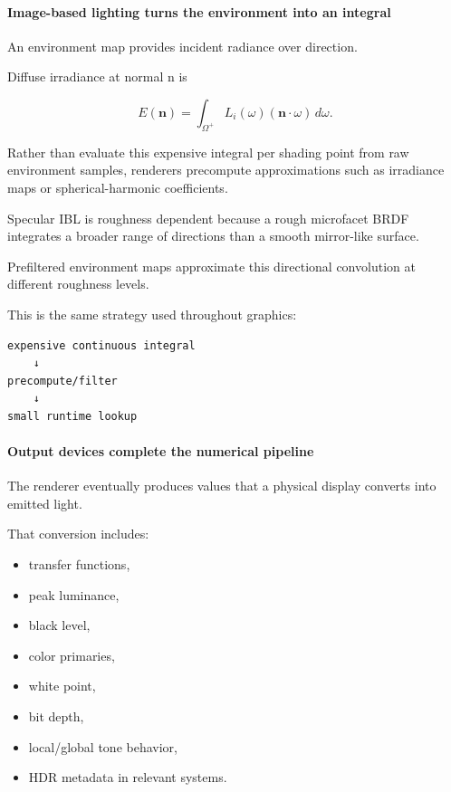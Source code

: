\paragraph{Image-based lighting turns the environment into an integral}\label{03-visual-computing-i-ch001-image-based-lighting-turns-the-environment-into-an-integral}

\hypertarget{03-visual-computing-i-ch001-image-based-lighting-turns-the-environment-into-an-integral}{}

An environment map provides incident radiance over direction.

Diffuse irradiance at normal n is

\[
E(\mathbf n)
=
\int_{\Omega^+}
L_i(\omega)
(\mathbf n\cdot\omega)
\,d\omega.
\]

Rather than evaluate this expensive integral per shading point from raw environment samples, renderers precompute approximations such as irradiance maps or spherical-harmonic coefficients.

Specular IBL is roughness dependent because a rough microfacet BRDF integrates a broader range of directions than a smooth mirror-like surface.

Prefiltered environment maps approximate this directional convolution at different roughness levels.

This is the same strategy used throughout graphics:

\begin{verbatim}
expensive continuous integral
    ↓
precompute/filter
    ↓
small runtime lookup
\end{verbatim}

\paragraph{Output devices complete the numerical pipeline}\label{03-visual-computing-i-ch001-output-devices-complete-the-numerical-pipeline}

\hypertarget{03-visual-computing-i-ch001-output-devices-complete-the-numerical-pipeline}{}

The renderer eventually produces values that a physical display converts into emitted light.

That conversion includes:

\begin{itemize}
\tightlist
\item
  transfer functions,
\item
  peak luminance,
\item
  black level,
\item
  color primaries,
\item
  white point,
\item
  bit depth,
\item
  local/global tone behavior,
\item
  HDR metadata in relevant systems.
\end{itemize}

